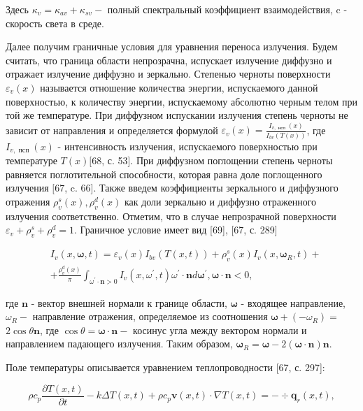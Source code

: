 \documentclass[10pt]{article}
\begin{document}
Здесь $\kappa_{v}=\kappa_{a v}+\kappa_{s v}-$ полный спектральный коэффициент взаимодействия, c - скорость света в среде.

Далее получим граничные условия для уравнения переноса излучения. Будем считать, что граница области непрозрачна, испускает излучение диффузно и отражает излучение диффузно и зеркально. Степенью черноты поверхности $\varepsilon_{v}(x)$ называется отношение количества энергии, испускаемого данной поверхностью, к количеству энергии, испускаемому абсолютно черным телом при той же температуре. При диффузном испускании излучения степень черноты не зависит от направления и определяется формулой $\varepsilon_{v}(x)=\frac{I_{v, \text { исп }}(x)}{I_{b v}(T(x))}$, где $I_{v, \text { псп }}(x)$ - интенсивность излучения, испускаемого поверхностью при температуре $T(x)[68$, с. 53]. При диффузном поглощении степень черноты равняется поглотительной способности, которая равна доле поглощенного излучения $[67$, c. 66]. Также введем коэффициенты зеркального и диффузного отражения $\rho_{v}^{s}(x), \rho_{v}^{d}(x)$ как доли зеркально и диффузно отраженного излучения соответственно. Отметим, что в случае непрозрачной поверхности $\varepsilon_{v}+\rho_{v}^{s}+\rho_{v}^{d}=1$. Граничное условие имеет вид [69], [67, с. 289]

$$
\begin{aligned}
&I_{v}(x, \boldsymbol{\omega}, t)=\varepsilon_{v}(x) I_{b v}(T(x, t))+\rho_{v}^{s}(x) I_{v}\left(x, \boldsymbol{\omega}_{R}, t\right)+ \\
&+\frac{\rho_{v}^{d}(x)}{\pi} \int_{\omega^{\prime} \cdot \mathbf{n}>0} I_{v}\left(x, \omega^{\prime}, t\right) \omega^{\prime} \cdot \mathbf{n} d \boldsymbol{\omega}^{\prime}, \boldsymbol{\omega} \cdot \mathbf{n}<0,
\end{aligned}
$$

где $\mathbf{n}$ - вектор внешней нормали к границе области, $\boldsymbol{\omega}$ - входящее направление, $\omega_{R}-$ направление отражения, определяемое из соотношения $\boldsymbol{\omega}+\left(-\omega_{R}\right)=$ $2 \cos \theta \mathbf{n}$, где $\cos \theta=\boldsymbol{\omega} \cdot \mathbf{n}-$ косинус угла между вектором нормали и направлением падающего излучения. Таким образом, $\boldsymbol{\omega}_{R}=\boldsymbol{\omega}-2(\boldsymbol{\omega} \cdot \mathbf{n}) \mathbf{n}$.

Поле температуры описывается уравнением теплопроводности [67, с. 297]:

$$
\rho c_{p} \frac{\partial T(x, t)}{\partial t}-k \Delta T(x, t)+\rho c_{p} \mathbf{v}(x, t) \cdot \nabla T(x, t)=-\div \mathbf{q}_{r}(x, t),
$$
\end{document}

